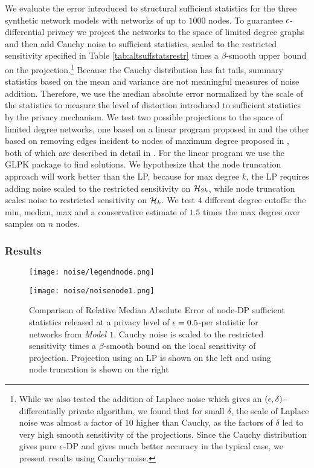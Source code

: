 We evaluate the error introduced to structural sufficient statistics for the three synthetic network models with networks of up to $1000$ nodes.  To guarantee $\epsilon$-differential privacy we project the networks to the space of limited degree graphs and then add Cauchy noise to sufficient statistics, scaled to the restricted sensitivity specified in Table \ref{tab:altsuffstatsrestr} times a $\beta$-smooth upper bound on the projection.\footnote{While we also tested the addition of Laplace noise which gives an $(\epsilon, \delta)$-differentially private algorithm, we found that for small $\delta$, the scale of Laplace noise was almost a factor of $10$ higher than Cauchy, as the factors of $\delta$ led to very high smooth sensitivity of the projections. Since the Cauchy distribution gives pure $\epsilon$-DP and gives much better accuracy in the typical case, we present results using Cauchy noise.} Because the Cauchy distribution has fat tails, summary statistics based on the mean and variance are not meaningful measures of noise addition. Therefore, we use the median absolute error normalized by the scale of the statistics to measure the level of distortion introduced to sufficient statistics by the privacy mechanism. We test two possible projections to the space of limited degree networks, one based on a linear program proposed in \cite{BBDS13} and the other based on removing edges incident to nodes of maximum degree proposed in \cite{KNRS13}, both of which are described in detail in . For the linear program we use the GLPK package to find solutions. We hypothesize that the node truncation approach will work better than the LP, because for max degree $k$, the LP requires adding noise scaled to the restricted sensitivity on $\mathcal{H}_{2k}$, while node truncation scales noise to restricted sensitivity on $\mathcal{H}_{k}$. We test $4$ different degree cutoffs: the min, median, max and a conservative estimate of $1.5$ times the max degree over samples on $n$ nodes.

\subsubsection*{Results}

\begin{figure}[hp]
	\caption{Comparison of Relative Median Absolute Error of node-DP sufficient statistics released at a privacy level of $\epsilon = 0.5$-per statistic for networks from \emph{Model $\mathit{1}$}. Cauchy noise is scaled to the restricted sensitivity times a $\beta$-smooth bound on the local sensitivity of projection. Projection using an LP is shown on the left and using node truncation is shown on the right}
	\label{nodenoise1}
	\centering
	\texttt{[image: noise/legendnode.png]}\\\vspace{0.2in}
	
	\texttt{[image: noise/noisenode1.png]}
\end{figure}

